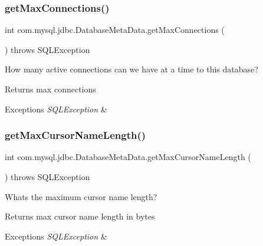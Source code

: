 \subsubsection{\texorpdfstring{get\+Max\+Connections()}{getMaxConnections()}}
{\footnotesize\ttfamily int com.\+mysql.\+jdbc.\+Database\+Meta\+Data.\+get\+Max\+Connections (\begin{DoxyParamCaption}{ }\end{DoxyParamCaption}) throws S\+Q\+L\+Exception}

How many active connections can we have at a time to this database?

\begin{DoxyReturn}{Returns}
max connections 
\end{DoxyReturn}

\begin{DoxyExceptions}{Exceptions}
{\em S\+Q\+L\+Exception} & \\
\hline
\end{DoxyExceptions}
\mbox{\label{classcom_1_1mysql_1_1jdbc_1_1_database_meta_data_a6eb004c904b7e9bf4fbd9be126cc150a}} 
\subsubsection{\texorpdfstring{get\+Max\+Cursor\+Name\+Length()}{getMaxCursorNameLength()}}
{\footnotesize\ttfamily int com.\+mysql.\+jdbc.\+Database\+Meta\+Data.\+get\+Max\+Cursor\+Name\+Length (\begin{DoxyParamCaption}{ }\end{DoxyParamCaption}) throws S\+Q\+L\+Exception}

What\textquotesingle{}s the maximum cursor name length?

\begin{DoxyReturn}{Returns}
max cursor name length in bytes 
\end{DoxyReturn}

\begin{DoxyExceptions}{Exceptions}
{\em S\+Q\+L\+Exception} & \\
\hline
\end{DoxyExceptions}
\mbox{\label{classcom_1_1mysql_1_1jdbc_1_1_database_meta_data_a005ab9a1c9fc029a8a4ccace4f84f99b}} 
